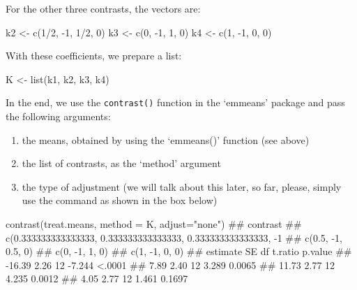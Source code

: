 \documentclass[a4paper,12pt,oneside]{book}
\providecommand{\tightlist}{%
  \setlength{\itemsep}{0pt}\setlength{\parskip}{0pt}}
\newenvironment{Shaded}{\begin{snugshade}}{\end{snugshade}}
\newcommand{\DecValTok}[1]{#1}
\newcommand{\SpecialCharTok}[1]{#1}
\newcommand{\StringTok}[1]{#1}
\newcommand{\DocumentationTok}[1]{#1}
\newcommand{\OtherTok}[1]{#1}
\newcommand{\FunctionTok}[1]{#1}
\newcommand{\AttributeTok}[1]{#1}
\newcommand{\NormalTok}[1]{#1}
\begin{document}
For the other three contrasts, the vectors are:

\begin{Shaded}
\begin{Highlighting}[]
\NormalTok{k2 }\OtherTok{\textless{}{-}} \FunctionTok{c}\NormalTok{(}\DecValTok{1}\SpecialCharTok{/}\DecValTok{2}\NormalTok{, }\SpecialCharTok{{-}}\DecValTok{1}\NormalTok{, }\DecValTok{1}\SpecialCharTok{/}\DecValTok{2}\NormalTok{, }\DecValTok{0}\NormalTok{)}
\NormalTok{k3 }\OtherTok{\textless{}{-}} \FunctionTok{c}\NormalTok{(}\DecValTok{0}\NormalTok{, }\SpecialCharTok{{-}}\DecValTok{1}\NormalTok{, }\DecValTok{1}\NormalTok{, }\DecValTok{0}\NormalTok{)}
\NormalTok{k4 }\OtherTok{\textless{}{-}} \FunctionTok{c}\NormalTok{(}\DecValTok{1}\NormalTok{, }\SpecialCharTok{{-}}\DecValTok{1}\NormalTok{, }\DecValTok{0}\NormalTok{, }\DecValTok{0}\NormalTok{)}
\end{Highlighting}
\end{Shaded}

With these coefficients, we prepare a list:

\begin{Shaded}
\begin{Highlighting}[]
\NormalTok{K }\OtherTok{\textless{}{-}} \FunctionTok{list}\NormalTok{(k1, k2, k3, k4)}
\end{Highlighting}
\end{Shaded}

In the end, we use the \texttt{contrast()} function in the `emmeans' package and pass the following arguments:

\begin{enumerate}
\def\labelenumi{\arabic{enumi}.}
\tightlist
\item
  the means, obtained by using the `emmeans()' function (see above)
\item
  the list of contrasts, as the `method' argument
\item
  the type of adjustment (we will talk about this later, so far, please, simply use the command as shown in the box below)
\end{enumerate}

\small

\begin{Shaded}
\begin{Highlighting}[]
\FunctionTok{contrast}\NormalTok{(treat.means, }\AttributeTok{method =}\NormalTok{ K, }\AttributeTok{adjust=}\StringTok{"none"}\NormalTok{)}
\DocumentationTok{\#\#  contrast                                                     }
\DocumentationTok{\#\#  c(0.333333333333333, 0.333333333333333, 0.333333333333333, {-}1}
\DocumentationTok{\#\#  c(0.5, {-}1, 0.5, 0)                                           }
\DocumentationTok{\#\#  c(0, {-}1, 1, 0)                                               }
\DocumentationTok{\#\#  c(1, {-}1, 0, 0)                                               }
\DocumentationTok{\#\#  estimate   SE df t.ratio p.value}
\DocumentationTok{\#\#    {-}16.39 2.26 12  {-}7.244  \textless{}.0001}
\DocumentationTok{\#\#      7.89 2.40 12   3.289  0.0065}
\DocumentationTok{\#\#     11.73 2.77 12   4.235  0.0012}
\DocumentationTok{\#\#      4.05 2.77 12   1.461  0.1697}
\end{Highlighting}
\end{Shaded}
\end{document}
